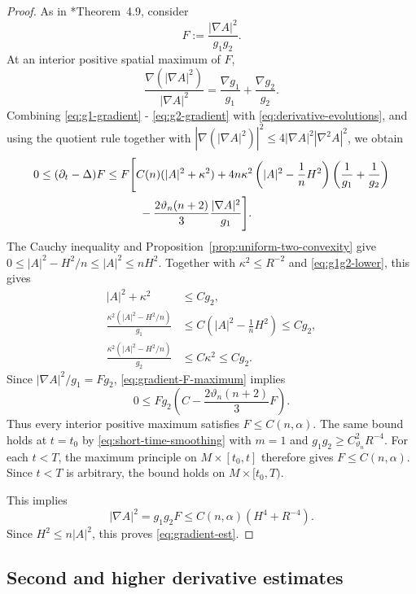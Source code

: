\documentclass[11pt,reqno]{amsart}
\theoremstyle{definition}
\theoremstyle{remark}
\numberwithin{equation}{section}
\begin{document}
\begin{proof}
As in \cite{LN21}*{Theorem~4.9}, consider
\begin{equation*}
 F:=\frac{|\nabla A|^2}{g_1g_2}.
\end{equation*}
At an interior positive spatial maximum of $F$, 
\begin{equation*}
 \frac{\nabla(|\nabla A|^2)}{|\nabla A|^2}
 =\frac{\nabla g_1}{g_1}+\frac{\nabla g_2}{g_2}.
\end{equation*}
Combining \eqref{eq:g1-gradient} - \eqref{eq:g2-gradient} with  \eqref{eq:derivative-evolutions}, and using the quotient rule together with $|\nabla(|\nabla A|^2)|^2
\leq4|\nabla A|^2|\nabla^2A|^2$, we obtain
\begin{align}
 0\leq(\partial_t-\Delta)F
 &\leq
 F\Bigg[
 C(n)(|A|^2+\kappa^2)
 +4n\kappa^2
 \left(|A|^2-\frac1nH^2\right)
 \left(\frac1{g_1}+\frac1{g_2}\right)\notag\\
 &\qquad\quad 
 -\frac{2\vartheta_n(n+2)}3\frac{|\nabla A|^2}{g_1}
 \Bigg].
 \label{eq:gradient-F-maximum}
\end{align}
 The Cauchy inequality and
Proposition~\ref{prop:uniform-two-convexity} give
$0\leq|A|^2-H^2/n\leq|A|^2\leq nH^2$.  Together with
$\kappa^2\leq R^{-2}$ and \eqref{eq:g1g2-lower}, this gives
\begin{align*}
 |A|^2+\kappa^2
 &\leq Cg_2,\\
 \frac{\kappa^2(|A|^2-H^2/n)}{g_1}
 &\leq C\left(|A|^2-\frac1nH^2\right)
 \leq Cg_2,\\
 \frac{\kappa^2(|A|^2-H^2/n)}{g_2}
 &\leq C\kappa^2\leq Cg_2.
\end{align*}
Since $|\nabla A|^2/g_1=Fg_2$,
\eqref{eq:gradient-F-maximum} implies
\begin{equation*}
 0\leq Fg_2
 \left(C-\frac{2\vartheta_n(n+2)}3F\right).
\end{equation*}
Thus every interior positive maximum satisfies $F\leq C(n,\alpha)$.  The
same bound holds at $t=t_0$ by \eqref{eq:short-time-smoothing} with $m=1$
and $g_1g_2\geq C_{\vartheta_n}^2R^{-4}$.  For each $t<T$, the maximum
principle on $M\times[t_0,t]$ therefore gives $F\leq C(n,\alpha)$.  Since
$t<T$ is arbitrary, the bound holds on $M\times[t_0,T)$.

This implies  
\begin{equation*}
 |\nabla A|^2=g_1g_2F\leq C(n,\alpha)(H^4+R^{-4}).
\end{equation*}
Since $H^2\leq n|A|^2$, this proves \eqref{eq:gradient-est}.
\end{proof}

\subsection{Second and higher derivative estimates}
\end{document}
